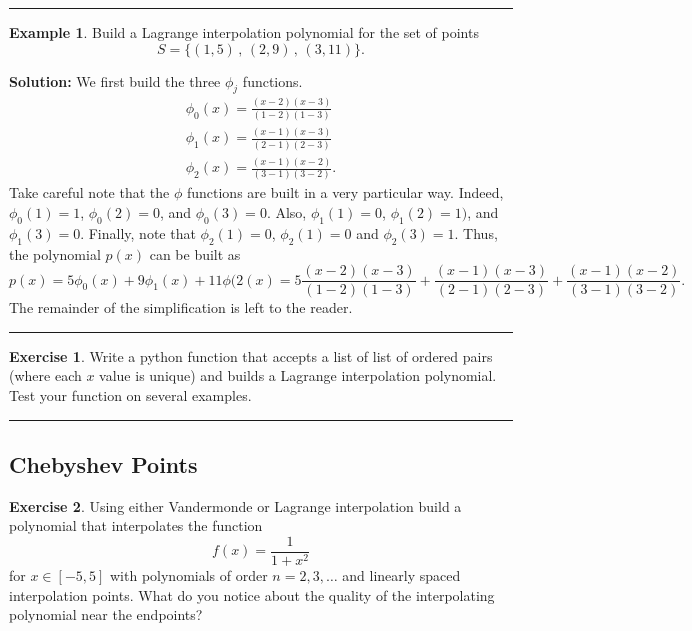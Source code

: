 \documentclass[
]{book}
\theoremstyle{definition}
\theoremstyle{definition}
\newtheorem{example}{Example}[chapter]
\theoremstyle{definition}
\newtheorem{exercise}{Exercise}[chapter]
\theoremstyle{remark}
\begin{document}
\begin{center}\rule{0.5\linewidth}{0.5pt}\end{center}

\begin{example}
\protect\hypertarget{exm:unnamed-chunk-847}{}{\label{exm:unnamed-chunk-847} }Build a Lagrange interpolation polynomial for the set of points
\[S  = \{(1,5)\,,\,(2,9)\,,\,(3,11)\}.\]

\textbf{Solution:} We first build the three \(\phi_j\) functions.
\[\begin{aligned}
        \phi_0(x) = \frac{(x-2)(x-3)}{(1-2)(1-3)} \\
        \phi_1(x) = \frac{(x-1)(x-3)}{(2-1)(2-3)} \\
        \phi_2(x) = \frac{(x-1)(x-2)}{(3-1)(3-2)}.
    \end{aligned}\]
Take careful note that the \(\phi\) functions are built in a very particular way. Indeed, \(\phi_0(1) = 1\), \(\phi_0(2) =0\), and \(\phi_0(3) = 0\). Also, \(\phi_1(1) = 0\), \(\phi_1(2) = 1)\), and \(\phi_1(3) = 0\). Finally, note that \(\phi_2(1) = 0\), \(\phi_2(1) = 0\) and \(\phi_2(3) = 1\). Thus, the polynomial \(p(x)\) can be built as
\[p(x) = 5 \phi_0(x) + 9 \phi_1(x) + 11 \phi(2(x) = 5 \frac{(x-2)(x-3)}{(1-2)(1-3)} +
    \frac{(x-1)(x-3)}{(2-1)(2-3)} + \frac{(x-1)(x-2)}{(3-1)(3-2)}.\]
The remainder of the simplification is left to the reader.
\end{example}

\begin{center}\rule{0.5\linewidth}{0.5pt}\end{center}

\begin{exercise}
\protect\hypertarget{exr:unnamed-chunk-848}{}{\label{exr:unnamed-chunk-848} }Write a python function that accepts a list of list of ordered pairs (where each \(x\) value is unique) and builds a Lagrange interpolation polynomial. Test your function on several examples.
\end{exercise}

\begin{center}\rule{0.5\linewidth}{0.5pt}\end{center}

\hypertarget{chebyshev-points}{%
\subsection{Chebyshev Points}\label{chebyshev-points}}

\begin{exercise}
\protect\hypertarget{exr:unnamed-chunk-849}{}{\label{exr:unnamed-chunk-849} }Using either Vandermonde or Lagrange interpolation build a polynomial
that interpolates the function \[f(x) = \frac{1}{1+x^2}\] for
\(x \in [-5,5]\) with polynomials of order \(n=2, 3, \ldots\) and linearly
spaced interpolation points. What do you notice about the quality of the
interpolating polynomial near the endpoints?
\end{exercise}
\end{document}
